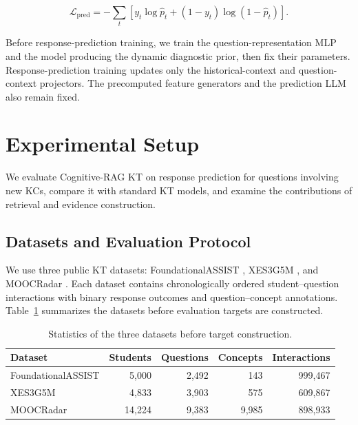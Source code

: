 \documentclass{llncs}
\begin{document}
\begin{equation}
\mathcal{L}_{\mathrm{pred}}=-\sum_t\left[y_t\log\hat{p}_t+(1-y_t)\log(1-\hat{p}_t)\right].
\end{equation}

Before response-prediction training, we train the question-representation MLP and the model producing the dynamic diagnostic prior, then fix their parameters. Response-prediction training updates only the historical-context and question-context projectors. The precomputed feature generators and the prediction LLM also remain fixed.

\section{Experimental Setup}

We evaluate Cognitive-RAG KT on response prediction for questions involving new KCs, compare it with standard KT models, and examine the contributions of retrieval and evidence construction.

\subsection{Datasets and Evaluation Protocol}

We use three public KT datasets: FoundationalASSIST \cite{worden2026foundationalassist}, XES3G5M \cite{liu2023xes3g5m}, and MOOCRadar \cite{yu2023moocradar}. Each dataset contains chronologically ordered student--question interactions with binary response outcomes and question--concept annotations. Table~\ref{tab:dataset‑split‑statistics} summarizes the datasets before evaluation targets are constructed.

\begingroup
\setlength{\intextsep}{6pt}

\begin{table}[H]
\centering
\small
\setlength{\tabcolsep}{4pt}
\renewcommand{\arraystretch}{1.1}
\caption{Statistics of the three datasets before target construction.}
\label{tab:dataset‑split‑statistics}
\begin{tabular*}{\linewidth}{@{\extracolsep{\fill}}lrrrr@{}}
\toprule
\textbf{Dataset} & \textbf{Students} & \textbf{Questions} & \textbf{Concepts} & \textbf{Interactions} \\
\midrule
FoundationalASSIST & 5,000 & 2,492 & 143 & 999,467 \\
XES3G5M & 4,833 & 3,903 & 575 & 609,867 \\
MOOCRadar & 14,224 & 9,383 & 9,985 & 898,933 \\
\bottomrule
\end{tabular*}
\end{table}
\endgroup
\end{document}
